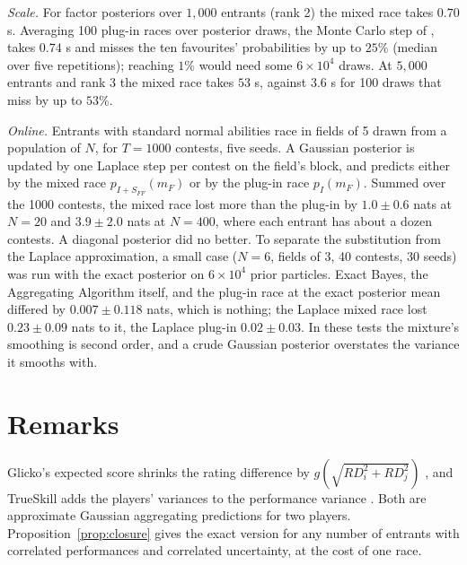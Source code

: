 \documentclass[11pt]{article}
\begin{document}
\emph{Scale.} For factor posteriors over $1{,}000$ entrants (rank 2)
the mixed race takes $0.70$ s. Averaging 100 plug-in races over
posterior draws, the Monte Carlo step of \citet{jezequel2021}, takes
$0.74$ s and misses the ten favourites' probabilities by up to $25\%$
(median over five repetitions); reaching $1\%$ would need some $6\times
10^4$ draws. At $5{,}000$ entrants and rank 3 the mixed race takes
$53$ s, against $3.6$ s for 100 draws that miss by up to $53\%$.

\emph{Online.} Entrants with standard normal abilities race in fields
of 5 drawn from a population of $N$, for $T=1000$ contests, five
seeds. A Gaussian posterior is updated by one Laplace step per contest
on the field's block, and predicts either by the mixed race
$p_{I+S_{FF}}(m_F)$ or by the plug-in race $p_I(m_F)$. Summed over
the 1000 contests, the mixed race lost more than the plug-in by
$1.0\pm0.6$ nats at $N=20$ and $3.9\pm2.0$ nats at $N=400$, where each
entrant has about a dozen contests. A diagonal posterior did no
better. To separate the substitution from the Laplace approximation,
a small case ($N=6$, fields of 3, 40 contests, 30 seeds) was run with
the exact posterior on $6\times10^4$ prior particles. Exact Bayes, the
Aggregating Algorithm itself, and the plug-in race at the exact
posterior mean differed by $0.007\pm0.118$ nats, which is nothing; the Laplace
mixed race lost $0.23\pm0.09$ nats to it, the Laplace plug-in
$0.02\pm0.03$. In these tests the mixture's smoothing is second order,
and a crude Gaussian posterior overstates the variance it smooths
with.

\section{Remarks}

Glicko's expected score shrinks the rating difference by
$g(\sqrt{RD_i^2+RD_j^2})$ \citep{glickman1999}, and TrueSkill adds the
players' variances to the performance variance \citep{herbrich2006}.
Both are approximate Gaussian aggregating predictions for two players.
Proposition~\ref{prop:closure} gives the exact version for any number
of entrants with correlated performances and correlated uncertainty,
at the cost of one race.
\end{document}

